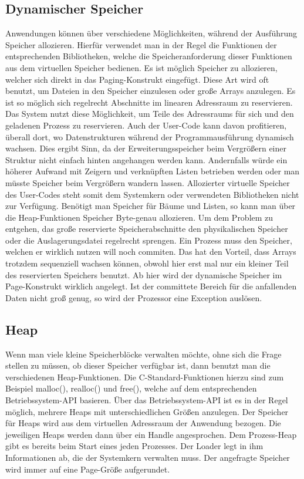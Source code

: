 ﻿\documentclass[12pt]{book}
\begin{document}
\subsection{Dynamischer Speicher}
Anwendungen können über verschiedene Möglichkeiten, während der Ausführung
Speicher allozieren. Hierfür verwendet man in der Regel die Funktionen der
entsprechenden Bibliotheken, welche die Speicheranforderung dieser Funktionen
aus dem virtuellen Speicher bedienen. Es ist möglich Speicher zu allozieren,
welcher sich direkt in das Paging-Konstrukt eingefügt. Diese Art wird oft
benutzt, um Dateien in den Speicher einzulesen oder große Arrays anzulegen. Es
ist so möglich sich regelrecht Abschnitte im linearen Adressraum zu reservieren.
Das System nutzt diese Möglichkeit, um Teile des Adressraums für sich und den
geladenen Prozess zu reservieren. Auch der User-Code kann davon profitieren,
überall dort, wo Datenstrukturen während der Programmausführung dynamisch
wachsen. Dies ergibt Sinn, da der Erweiterungsspeicher beim Vergrößern einer
Struktur nicht einfach hinten angehangen werden kann. Andernfalls würde ein
höherer Aufwand mit Zeigern und verknüpften Listen betrieben werden oder man
müsste Speicher beim Vergrößern wandern lassen. Allozierter virtuelle Speicher
des User-Codes steht somit dem Systemkern oder verwendeten Bibliotheken nicht
zur Verfügung. Benötigt man Speicher für Bäume und Listen, so kann man über die
Heap-Funktionen Speicher Byte-genau allozieren. Um dem Problem zu entgehen, das
große reservierte Speicherabschnitte den physikalischen Speicher oder die
Auslagerungsdatei regelrecht sprengen. Ein Prozess muss den Speicher, welchen er
wirklich nutzen will noch commiten. Das hat den Vorteil, dass Arrays trotzdem
sequenziell wachsen können, obwohl hier erst mal nur ein kleiner Teil des
reservierten Speichers benutzt. Ab hier wird der dynamische Speicher im
Page-Konstrukt wirklich angelegt. Ist der committete Bereich für die anfallenden
Daten nicht groß genug, so wird der Prozessor eine Exception auslösen.

\subsection{Heap}
Wenn man viele kleine Speicherblöcke verwalten möchte, ohne sich die Frage
stellen zu müssen, ob dieser Speicher verfügbar ist, dann benutzt man die
verschiedenen Heap-Funktionen. Die C-Standard-Funktionen hierzu sind zum
Beispiel malloc(), realloc() und free(), welche auf dem entsprechenden
Betriebssystem-API basieren. Über das Betriebssystem-API ist es in der Regel
möglich, mehrere Heaps mit unterschiedlichen Größen anzulegen. Der Speicher für
Heaps wird aus dem virtuellen Adressraum der Anwendung bezogen. Die jeweiligen
Heaps werden dann über ein Handle angesprochen. Dem Prozess-Heap gibt es bereits
beim Start eines jeden Prozesses. Der Loader legt in ihm Informationen ab, die
der Systemkern verwalten muss. Der angefragte Speicher wird immer auf eine
Page-Größe aufgerundet.
\end{document}
